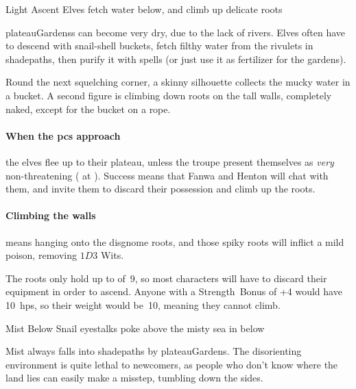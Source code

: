 
{Light Ascent}%
{Elves fetch water below, and climb up delicate roots}%
\label{shadeAscent}

\Glspl{plateauGardens} can become very dry, due to the lack of rivers.
Elves often have to descend with snail-shell buckets, fetch filthy water from the rivulets in \gls{shadepaths}, then purify it with spells (or just use it as fertilizer for the gardens).

\begin{boxtext}
  Round the next squelching corner, a skinny silhouette collects the mucky water in a bucket.
  A second figure is climbing down roots on the tall walls, completely naked, except for the bucket on a rope.
\end{boxtext}

\paragraph{When the \glspl{pc} approach}
the elves flee up to their plateau, unless the troupe present themselves as \emph{very} non-threatening ( at \tn[10]).
Success means that Fanwa and Henton will chat with them, and invite them to discard their possession and climb up the roots.


\showStdSpells

\paragraph{Climbing the walls}
means hanging onto the \gls{disgnome} roots, and those spiky roots will inflict a mild poison, removing $1D3$ Wits.

The roots only hold up to  of~9, so most characters will have to discard their equipment in order to ascend.
Anyone with a Strength~Bonus of +4 would have 10~\glspl{hp}, so their \gls{weight} would be~10, meaning they cannot climb.

{Mist Below}%
{Snail eyestalks poke above the misty sea in  below}%

Mist always falls into \gls{shadepaths} by \gls{plateauGardens}.
The disorienting environment is quite lethal to newcomers, as people who don't know where the land lies can easily make a misstep, tumbling down the sides.

